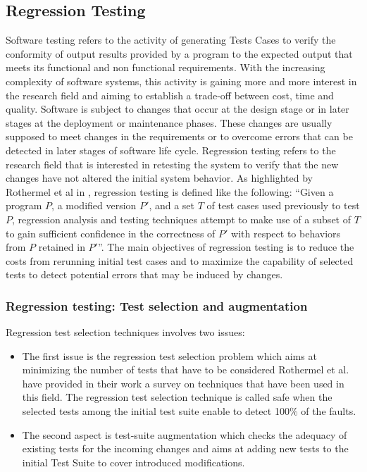 \subsection{Regression Testing}
Software testing \cite{Myers:1979:AST:539883} refers to the activity of generating Tests Cases to verify the conformity of output results provided by a 
program to the expected output that meets its functional and non functional requirements. With the increasing complexity of software systems, 
this activity is gaining more and more interest in the research field and aiming to establish a trade-off between cost, time and quality. 
Software is subject to changes that occur at the design stage or in later stages at the deployment or maintenance phases. These changes are 
usually supposed to meet changes in the requirements or to overcome errors that can be detected in later stages of software life cycle. 
Regression testing refers to the research field that is interested in retesting the system to verify that the new changes have not altered 
the initial system behavior. As highlighted by Rothermel et al in \cite{Rothermel:1996:ART:235681.235682}, regression testing is defined like the 
following: 
``Given a program $P$, a modified version $P'$, and a set $T$ of test cases used previously to test $P$, regression analysis and testing 
techniques attempt to make use of a subset of $T$ to gain sufficient confidence in the correctness of $P'$ with respect to behaviors from $P$ retained 
in $P'$''. The main objectives of regression testing is to reduce the costs from rerunning initial test cases and to maximize the capability of 
selected tests to detect potential errors that may be induced by changes.

\subsubsection{Regression testing: Test selection and augmentation}
Regression test selection techniques involves two issues:
\begin{itemize}
\item The first issue is the regression test selection problem which aims at minimizing the number of tests that have to be considered 
Rothermel et al. \cite{Rothermel:1996:ART:235681.235682} have provided in their work a survey on techniques that have been used in this field. 
The regression test selection technique is called safe when the selected tests among the initial test suite enable to detect 100\% of the faults.
\item The second aspect is test-suite augmentation which checks the adequacy of existing tests for the incoming changes
and aims at adding new tests to the initial Test Suite to cover introduced modifications.
\end{itemize}

